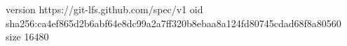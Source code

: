 version https://git-lfs.github.com/spec/v1
oid sha256:ca4ef865d2b6abf64e8dc99a2a7ff320b8ebaa8a124fd80745cdad68f8a80560
size 16480
